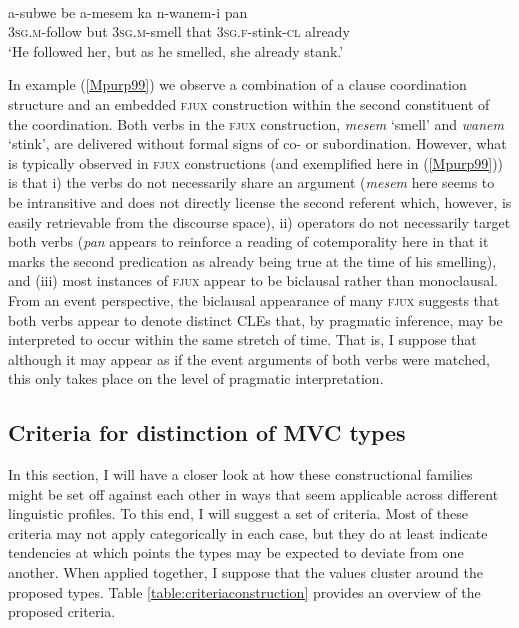 \ea \label{Mpurp99}
\\
\gll a-subwe be a-mesem ka n-wanem-i pan \\
\textsc{3}\textsc{sg}.\textsc{m}-follow but \textsc{3}\textsc{sg}.\textsc{m}-smell that \textsc{3}\textsc{sg}.\textsc{f}-stink-\textsc{cl} already \\
\glft `He followed her, but as he smelled, she already stank.' \\ 
\z

In example (\ref{Mpurp99}) we observe a combination of a clause coordination structure and an embedded \textsc{fjux} construction within the second constituent of the coordination. Both verbs in the \textsc{fjux} construction, \textit{mesem} `smell' and \textit{wanem} `stink', are delivered without formal signs of co- or subordination. However, what is typically observed in \textsc{fjux} constructions (and exemplified here in (\ref{Mpurp99})) is that i) the verbs do not necessarily share an argument (\textit{mesem} here seems to be intransitive and does not directly license the second referent which, however, is easily retrievable from the discourse space), ii) operators do not necessarily target both verbs (\textit{pan} appears to reinforce a reading of cotemporality here in that it marks the second predication as already being true at the time of his smelling), and (iii) most instances of \textsc{fjux} appear to be biclausal rather than monoclausal. From an event perspective, the biclausal appearance of many \textsc{fjux} suggests that both verbs appear to denote distinct CLEs that, by pragmatic inference, may be interpreted to occur within the same stretch of time. That is, I suppose that although it may appear as if the event arguments of both verbs were matched, this only takes place on the level of pragmatic interpretation.

\subsection{Criteria for distinction of MVC types}\label{sec:criteria_mvcs}

In this section, I will have a closer look at how these constructional families might be set off against each other in ways that seem applicable across different linguistic profiles. To this end, I will suggest a set of criteria. Most of these criteria may not apply categorically in each case, but they do at least indicate tendencies at which points the types may be expected to deviate from one another. When applied together, I suppose that the values cluster around the proposed types. Table \ref{table:criteriaconstruction} provides an overview of the proposed criteria.

